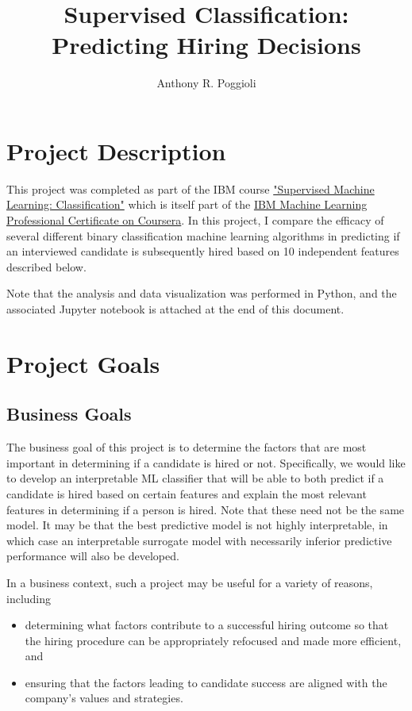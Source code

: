\documentclass[12pt]{article}
\begin{document}
\title{Supervised Classification: Predicting Hiring Decisions}
\author{Anthony R. Poggioli}
\maketitle

\section{Project Description}

This project was completed as part of the IBM course \href{https://www.coursera.org/learn/supervised-machine-learning-classification}{"Supervised Machine Learning: Classification"} which is itself part of the \href{https://www.coursera.org/professional-certificates/ibm-machine-learning}{IBM Machine Learning Professional Certificate on Coursera}. In this project, I compare the efficacy of several different binary classification machine learning algorithms in predicting if an interviewed candidate is subsequently hired based on 10 independent features described below.

Note that the analysis and data visualization was performed in Python, and the associated Jupyter notebook is attached at the end of this document.

\section{Project Goals}

\subsection{Business Goals}

The business goal of this project is to determine the factors that are most important in determining if a candidate is hired or not. Specifically, we would like to develop an interpretable ML classifier that will be able to both predict if a candidate is hired based on certain features and explain the most relevant features in determining if a person is hired. Note that these need not be the same model. It may be that the best predictive model is not highly interpretable, in which case an interpretable surrogate model with necessarily inferior predictive performance will also be developed.

In a business context, such a project may be useful for a variety of reasons, including
\begin{itemize}
\item determining what factors contribute to a successful hiring outcome so that the hiring procedure can be appropriately refocused and made more efficient, and
\item ensuring that the factors leading to candidate success are aligned with the company's values and strategies.
\end{itemize}
\end{document}
